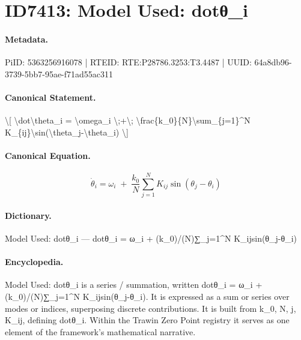 \section*{ID7413: Model Used: dotθ\_i}
\paragraph{Metadata.}
PiID: 5363256916078 | RTEID: RTE:P28786.3253:T3.4487 | UUID: 64a8db96-3739-5bb7-95ae-f71ad55ac311

\paragraph{Canonical Statement.}
\textbackslash{}[ \textbackslash{}dot\textbackslash{}theta\_i = \textbackslash{}omega\_i \textbackslash{};+\textbackslash{}; \textbackslash{}frac\{k\_0\}\{N\}\textbackslash{}sum\_\{j=1\}\textasciicircum{}N K\_\{ij\}\textbackslash{}sin(\textbackslash{}theta\_j-\textbackslash{}theta\_i) \textbackslash{}]

\paragraph{Canonical Equation.}
\[
\dot\theta_i = \omega_i \;+\; \frac{k_0}{N}\sum_{j=1}^N K_{ij}\sin(\theta_j-\theta_i)
\]

\paragraph{Dictionary.}
Model Used: dotθ\_i — dotθ\_i = ω\_i + (k\_0)/(N)∑\_j=1\textasciicircum{}N K\_ijsin(θ\_j-θ\_i)

\paragraph{Encyclopedia.}
Model Used: dotθ\_i is a series / summation, written dotθ\_i = ω\_i + (k\_0)/(N)∑\_j=1\textasciicircum{}N K\_ijsin(θ\_j-θ\_i). It is expressed as a sum or series over modes or indices, superposing discrete contributions. It is built from k\_0, N, j, K\_ij, defining dotθ\_i. Within the Trawin Zero Point registry it serves as one element of the framework's mathematical narrative.
